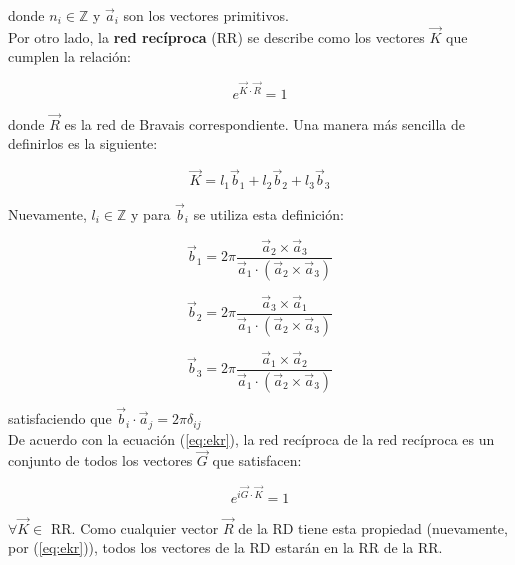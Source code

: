 \documentclass[a4paper]{article}
\begin{document}
donde $n_{i} \in \mathbb{Z}$ y $\vec{a}_{i}$ son los vectores primitivos.\\

Por otro lado, la \textbf{red rec\'iproca} (RR) se describe como los vectores $\vec{K}$ que cumplen la relaci\'on:

\begin{equation}
\label{eq:ekr}
e^{\vec{K} \cdot \vec{R}} = 1
\end{equation}

donde $\vec{R}$ es la red de Bravais correspondiente. Una manera m\'as sencilla de definirlos es la siguiente:

\begin{equation}
\label{eq:redreciproca}
\vec{K} = l_{1}\vec{b}_{1} + l_{2}\vec{b}_{2} + l_{3}\vec{b}_{3}
\end{equation}

Nuevamente, $l_{i} \in \mathbb{Z}$ y para $\vec{b}_{i}$ se utiliza esta definici\'on:

$$\vec{b}_{1} = 2\pi  \frac{\vec{a}_{2} \times \vec{a}_{3}}{\vec{a}_{1} \cdot (\vec{a}_{2} \times \vec{a}_{3})}$$

$$\vec{b}_{2} = 2\pi  \frac{\vec{a}_{3} \times \vec{a}_{1}}{\vec{a}_{1} \cdot (\vec{a}_{2} \times \vec{a}_{3})}$$ 

$$\vec{b}_{3} = 2\pi  \frac{\vec{a}_{1} \times \vec{a}_{2}}{\vec{a}_{1} \cdot (\vec{a}_{2} \times \vec{a}_{3})}$$

satisfaciendo que $\vec{b}_{i} \cdot \vec{a}_{j} = 2\pi \delta_{ij}$\\

De acuerdo con la ecuaci\'on (\ref{eq:ekr}), la red rec\'iproca de la red rec\'iproca es un conjunto de todos los vectores $\vec{G}$ que satisfacen:

$$e^{i \vec{G} \cdot \vec{K}} = 1$$

$\forall \vec{K} \in$ RR. Como cualquier vector $\vec{R}$ de la RD tiene esta propiedad (nuevamente, por (\ref{eq:ekr})), todos los vectores de la RD estar\'an en la RR de la RR.\\
\end{document}
